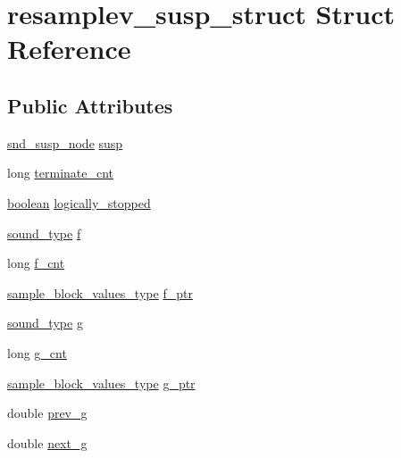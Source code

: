 \hypertarget{structresamplev__susp__struct}{}\section{resamplev\+\_\+susp\+\_\+struct Struct Reference}
\label{structresamplev__susp__struct}
\subsection*{Public Attributes}
\begin{DoxyCompactItemize}
\item 
\hyperlink{sound_8h_a6b268203688a934bd798ceb55f85d4c0}{snd\+\_\+susp\+\_\+node} \hyperlink{structresamplev__susp__struct_a3cff55d39d48a620fe191cce27d1cb21}{susp}
\item 
long \hyperlink{structresamplev__susp__struct_a5d67ef3f0f6a444343cddcd7154f0d70}{terminate\+\_\+cnt}
\item 
\hyperlink{cext_8h_a7670a4e8a07d9ebb00411948b0bbf86d}{boolean} \hyperlink{structresamplev__susp__struct_ac50c0598259f86ca40f2ce5de257570c}{logically\+\_\+stopped}
\item 
\hyperlink{sound_8h_a792cec4ed9d6d636d342d9365ba265ea}{sound\+\_\+type} \hyperlink{structresamplev__susp__struct_a4e390c990c2826522cc600b33ef3f3d8}{f}
\item 
long \hyperlink{structresamplev__susp__struct_a49c69750011f86978c130336f65eec29}{f\+\_\+cnt}
\item 
\hyperlink{sound_8h_a83d17f7b465d1591f27cd28fc5eb8a03}{sample\+\_\+block\+\_\+values\+\_\+type} \hyperlink{structresamplev__susp__struct_acefca25d401d362e145b1b7e9f0cec08}{f\+\_\+ptr}
\item 
\hyperlink{sound_8h_a792cec4ed9d6d636d342d9365ba265ea}{sound\+\_\+type} \hyperlink{structresamplev__susp__struct_a75da938aec1d9ed1a74115718394eb17}{g}
\item 
long \hyperlink{structresamplev__susp__struct_aaf8bdb30ef64710c84ab87dce5e4df1c}{g\+\_\+cnt}
\item 
\hyperlink{sound_8h_a83d17f7b465d1591f27cd28fc5eb8a03}{sample\+\_\+block\+\_\+values\+\_\+type} \hyperlink{structresamplev__susp__struct_aa6aae99596bd0840c66ba894a9bb5a03}{g\+\_\+ptr}
\item 
double \hyperlink{structresamplev__susp__struct_ab3c0619259c144334c422f1243cbff44}{prev\+\_\+g}
\item 
double \hyperlink{structresamplev__susp__struct_ad3d36551625f7c95640b793535aba9fa}{next\+\_\+g}

\end{DoxyCompactItemize}
